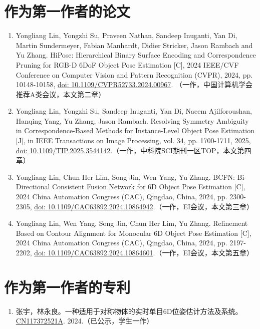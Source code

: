 \cleardoublepage
{}

\section*{作为第一作者的论文}

\begin{sloppypar}  %

\begin{enumerate}
    \item Yongliang Lin, Yongzhi Su, Praveen Nathan, Sandeep Inuganti, Yan Di, Martin Sundermeyer, Fabian Manhardt, Didier Stricker, Jason Rambach and Yu Zhang. HiPose: Hierarchical Binary Surface Encoding and Correspondence Pruning for RGB-D 6DoF Object Pose Estimation [C], 2024 IEEE/CVF Conference on Computer Vision and Pattern Recognition (CVPR), 2024, pp. 10148-10158, \href{https://doi.org/10.1109/CVPR52733.2024.00967}{doi: 10.1109/CVPR52733.2024.00967}. （一作，中国计算机学会推荐A类会议，本文第二章）
    \item Yongliang Lin, Yongzhi Su, Sandeep Inuganti, Yan Di, Naeem Ajilforoushan, Hanqing Yang, Yu Zhang, Jason Rambach. Resolving Symmetry Ambiguity in Correspondence-Based Methods for Instance-Level Object Pose Estimation [J], in IEEE Transactions on Image Processing, vol. 34, pp. 1700-1711, 2025, \href{https://doi.org/10.1109/TIP.2025.3544142}{doi: 10.1109/TIP.2025.3544142}.（一作，中科院SCI期刊一区TOP，本文第四章）
    \item Yongliang Lin, Chun Her Lim, Song Jin, Wen Yang, Yu Zhang. BCFN: Bi-Directional Consistent Fusion Network for 6D Object Pose Estimation [C], 2024 China Automation Congress (CAC), Qingdao, China, 2024, pp. 2300-2305, \href{https://doi.org/10.1109/CAC63892.2024.10864942}{doi: 10.1109/CAC63892.2024.10864942}.（一作，EI会议，本文第三章）
    \item Yongliang Lin, Wen Yang, Song Jin, Chun Her Lim, Yu Zhang. Refinement Based on Contour Alignment for Monocular 6D Object Pose Estimation [C], 2024 China Automation Congress (CAC), Qingdao, China, 2024, pp. 2197-2202, \href{https://doi.org/10.1109/CAC63892.2024.10864601}{doi: 10.1109/CAC63892.2024.10864601}.（一作，EI会议，本文第五章）
\end{enumerate}

\section*{作为第一作者的专利}
\begin{enumerate}
    \item 张宇，林永良。一种适用于对称物体的实时单目6D位姿估计方法及系统。\href{https://patents.google.com/patent/CN117372521A}{CN117372521A}. 2024.（已公示，学生一作）
\end{enumerate}


\end{sloppypar}
